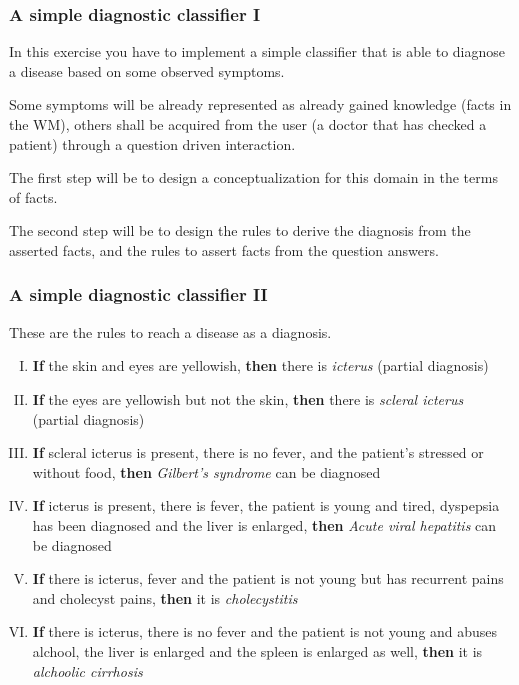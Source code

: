 \documentclass[xcolor={usenames,dvipsnames,svgnames}, compress]{beamer}
\begin{document}
\begin{frame}
  \frametitle{A simple diagnostic classifier I}
  In this exercise you have to implement a simple classifier that is
  able to diagnose a disease based on some observed
  symptoms.\par\bigskip

  Some symptoms will be already represented as already gained
  knowledge (facts in the WM), others shall be acquired from the user
  (a doctor that has checked a patient) through a question driven interaction.\par\bigskip

  The first step will be to design a conceptualization for this domain
  in the terms of facts.\par\bigskip

  The second step will be to design the rules to derive the diagnosis
  from the asserted facts, and the rules to assert facts from the
  question answers.

  
\end{frame}

\begin{frame}
  \frametitle{A simple diagnostic classifier II}
  These are the rules to reach a disease as a diagnosis.
  \begin{enumerate}[I.]
  \item \textbf{If} the skin and eyes are yellowish, \textbf{then}
    there is \emph{icterus} (partial diagnosis)
    \item  \textbf{If} the eyes are yellowish but not the skin, \textbf{then} there is
      \emph{scleral icterus} (partial diagnosis)
  \item \textbf{If} scleral icterus is present, there is no fever, and the
  patient's stressed or without food, \textbf{then} \emph{Gilbert's syndrome} can be
  diagnosed
  \item  \textbf{If} icterus is present, there is fever, the patient is young
    and tired, dyspepsia has been diagnosed and the liver is enlarged,
    \textbf{then} \emph{Acute viral hepatitis} can be diagnosed
  \item  \textbf{If} there is icterus, fever and the patient is not young but
    has recurrent pains and cholecyst pains, \textbf{then} it is  \emph{cholecystitis}
  \item \textbf{If} there is icterus, there is no fever and the patient is not
    young and abuses alchool, the liver is enlarged and the spleen is
    enlarged as well, \textbf{then} it is \emph{alchoolic cirrhosis}
   \end{enumerate}
\end{frame}
\end{document}
